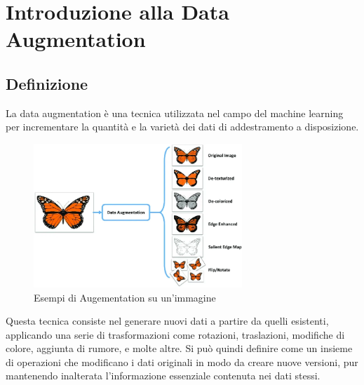 \section{Introduzione alla Data Augmentation}

\subsection{Definizione}
La data augmentation è una tecnica utilizzata nel campo del machine learning per incrementare la quantità e la varietà dei dati di addestramento a disposizione. 

\begin{figure}[ht]
    \centering
    \includegraphics[width=0.7\textwidth]{files/capitoli/3-data-augmentation/assets/augmentation-example.png}
    \caption{\label{fig:augmentation-example}Esempi di Augementation su un'immagine\cite{33}}
\end{figure}

\newpage

Questa tecnica consiste nel generare nuovi dati a partire da quelli esistenti, applicando una serie di trasformazioni come rotazioni, traslazioni, modifiche di colore, aggiunta di rumore, e molte altre. Si può quindi definire come un insieme di operazioni che modificano i dati originali in modo da creare nuove versioni, pur mantenendo inalterata l'informazione essenziale contenuta nei dati stessi.

